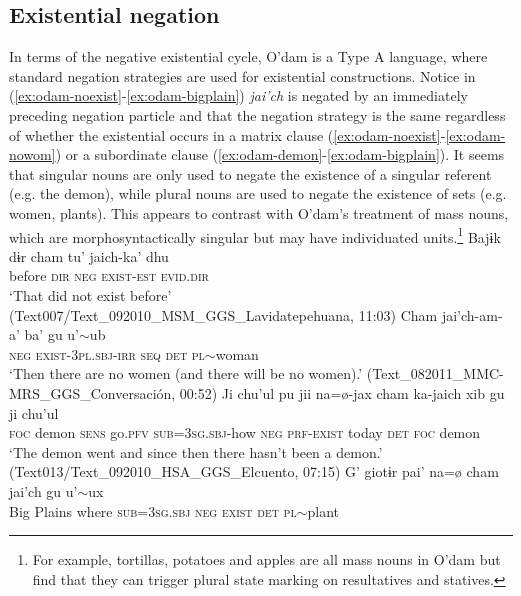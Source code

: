 \documentclass[output=paper]{langsci/langscibook}
\begin{document}
\subsection{Existential negation}
\label{sec:odam-exneg}
In terms of the negative existential cycle, O’dam is a Type A language, where standard negation strategies are used for existential constructions. Notice in (\ref{ex:odam-noexist}-\ref{ex:odam-bigplain}) \emph{jai’ch} is negated by an immediately preceding negation particle and that the negation strategy is the same regardless of whether the existential occurs in a matrix clause (\ref{ex:odam-noexist}-\ref{ex:odam-nowom}) or a subordinate clause (\ref{ex:odam-demon}-\ref{ex:odam-bigplain}). It seems that singular nouns are only used to negate the existence of a singular referent (e.g. the demon), while plural nouns are used to negate the existence of sets (e.g. women, plants). This appears to contrast with O’dam’s treatment of mass nouns, which are morphosyntactically singular but may have individuated units.\footnote{For example, tortillas, potatoes and apples are all mass nouns in O’dam but \citet{everdelld2019} find that they can trigger plural state marking on resultatives and statives.}
\ea
\label{ex:odam-noexist}
\gll Bajɨk	dɨr 	{cham tu'} 	jaich-ka' 	dhu\\
before 	\textsc{dir} 	\textsc{neg}		\textsc{exist-est}	\textsc{evid.dir}\\
\glt ‘That did not exist before’ (Text007/Text\_092010\_MSM\_GGS\_Lavidatepehuana, 11:03)
\z 
\ea
\label{ex:odam-nowom}
\gll Cham 	jai’ch-am-a’ 		ba’ 	gu 	u’$\sim$ub\\
\textsc{neg}	\textsc{exist-3pl.sbj-irr}	\textsc{seq}	\textsc{det}	\textsc{pl}$\sim$woman\\
\glt ‘Then there are no women (and there will be no women).’ (Text\_082011\_MMC-MRS\_GGS\_Conversaci\'on, 00:52)
\z 
\ea
\label{ex:odam-demon}
\gll Ji 	chu'ul 		pu	jii     		na=\o-jax	cham	ka-jaich 	xib gu  	ji 	chu'ul\\
\textsc{foc}	demon   	\textsc{sens} 	go.\textsc{pfv} 	\textsc{sub=3sg.sbj}-how 	\textsc{neg}  	\textsc{prf-exist} today \textsc{det} 	\textsc{foc}	demon\\
\glt ‘The demon went and since then there hasn’t been a demon.’ (Text013/Text\_092010\_HSA\_GGS\_Elcuento, 07:15)
\z 
\ea
\label{ex:odam-bigplain}
\gll G' 	giotɨr 	pai' 	{na=\o} 	cham 	jai'ch 	gu 	u'$\sim$ux\\
Big	Plains	where	\textsc{sub=3sg.sbj}	\textsc{neg}	\textsc{exist}	\textsc{det}	\textsc{pl}$\sim$plant\\
\end{document}
